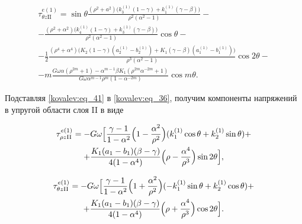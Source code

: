  \begin{multline}

      \tau_{\theta z\mathrm{II}}^{e(1)}=\sin\theta\frac{(\rho^2+a^2)\bigl(k_3^{(1)}(1-\gamma)+k_1^{(1)}(\gamma-\beta)\bigr)}{\rho^2(\alpha^2-1)}-\\

    -\frac{(\rho^2+\alpha^2)\bigl(k_4^{(1)}(1-\gamma)+k_3^{(1)}(\gamma-\beta)\bigr)}{\rho^2(\alpha^2-1)} \cos\theta-\\

\label{kovalev:eq_43}

    -\frac12\frac{(\rho^4+\alpha^4)\bigl(K_2(1-\gamma)(a_2^{(1)}-b_2^{(1)})+ K_1(\gamma-\beta)(a_1^{(1)}-b_1^{(1)})\bigr)}{\rho^3(\alpha^2-1)} \cos2\theta -\\

    -m\frac{G\omega\alpha(\rho^{2m}+1)-\alpha^{m-1}\beta K_1(\rho^{2m}\alpha^{-2m}+1)}{G\omega\alpha^{m-1}\rho^{m}(1-\alpha^{-2m})}\cos m\theta.

  \end{multline}

Подставляя \eqref{kovalev:eq_41} в \eqref{kovalev:eq_36}, получим компоненты напряжений в упругой области слоя II в виде

 \begin{multline}

\label{kovalev:eq_44}

  \tau_{\rho z\mathrm{II}}^{e(1)}=-G\omega

  \Bigl[\frac{\gamma-1}{1-\alpha^2}\Bigl(1-\frac{\alpha^2}{\rho^2}\Bigr) (k_1^{(1)}\cos\theta+k_2^{(1)}\sin\theta )+\\

  +\frac{K_1(a_1-b_1)(\beta-\gamma)}{4(1-\alpha^4)}\Bigl(\rho-\frac{\alpha^4}{\rho^3}\Bigr)\sin2\theta\Bigr],

 \end{multline}

 \begin{multline}

\label{kovalev:eq_45}

  \tau_{\theta z\mathrm{II}}^{e(1)}=-G\omega

  \Bigl[\frac{\gamma-1}{1-\alpha^2}\Bigl(1+\frac{\alpha^2}{\rho^2}\Bigr)

  (-k_1^{(1)}\sin\theta+k_2^{(1)}\cos\theta)+\\

  +\frac{K_1(a_1-b_1)(\beta-\gamma)}{4(1-\alpha^4)}\Bigl(\rho+\frac{\alpha^4}{\rho^3}\Bigr)\cos2\theta\Bigr].

 \end{multline}



